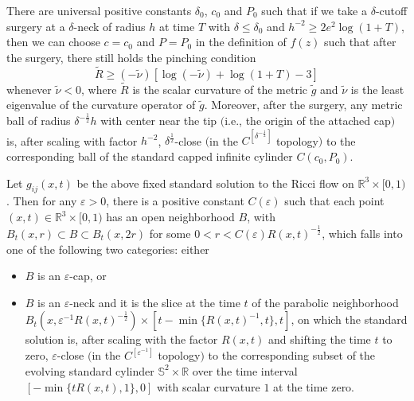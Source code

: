 \begin{lemma}
  \label{lem:cz-surgery-preserves-hamilton-ivey-pinching}
 There
are universal positive constants $\delta_0$, $c_0$ and $P_0$ such
that if we take a $\delta$-cutoff surgery at a $\delta$-neck of
radius $h$ at time $T$ with $\delta \leq \delta_0$ and $h^{-2}
\geq 2e^2\log(1+T)$, then we can choose $c=c_0$ and $P=P_0$ in the
definition of $f(z)$ such that after the surgery, there still
holds the pinching condition \begin{equation} \tilde{R} \geq
(-\tilde{\nu})[\log(-\tilde{\nu}) + \log(1+T) -3]
\end{equation} whenever $\tilde{\nu} < 0$, where $\tilde{R}$ is the scalar
curvature of the metric $\tilde{g}$ and $\tilde{\nu}$ is the least
eigenvalue of the curvature operator of $\tilde{g}$. Moreover,
after the surgery, any metric ball of radius
$\delta^{-\frac{1}{2}}h$ with center near the tip $($i.e., the
origin of the attached cap$)$ is, after scaling with factor
$h^{-2}$, $\delta^{\frac{1}{2}}$-close $($in the
$C^{[\delta^{-\frac{1}{2}}]}$ topology$)$ to the corresponding
ball of the standard capped infinite cylinder $C(c_0,P_0)$.
\end{lemma}
\begin{lemma}
  \label{lem:cz-standard-solution-canonical-neighborhoods}

Let $g_{ij}(x,t)$ be the above fixed standard solution to the
Ricci flow on $\mathbb{R}^3\times [0,1)$.  Then for any
$\varepsilon>0$, there is a positive constant $C(\varepsilon)$
such that each point $(x,t) \in \mathbb{R}^3\times [0,1)$ has an
open neighborhood $B$, with $B_t(x,r)\subset B \subset B_t(x,2r)$
for some $0<r<C(\varepsilon)R(x,t)^{-\frac{1}{2}}$, which falls
into one of the following two categories: either
\begin{itemize}
\item[(a)] $B$ is  an $\varepsilon$-cap, or \item[(b)] $B$ is an
$\varepsilon$-neck and it is the slice at the time $t$ of the
parabolic neighborhood
$B_t(x,\varepsilon^{-1}R(x,t)^{-\frac{1}{2}}) \times [t-\min
\{R(x,t)^{-1},t\},t]$, on which the standard solution is, after
scaling with the factor $R(x,t)$ and shifting the time $t$ to
zero, $\varepsilon$-close $($in the $C^{[\varepsilon^{-1}]}$
topology$)$ to the corresponding subset of the evolving standard
cylinder $\mathbb{S}^2 \times \mathbb{R}$ over the time interval
$[-\min \{tR(x,t),1\},0]$ with scalar curvature $1$ at the time
zero.
\end{itemize}
\end{lemma}
